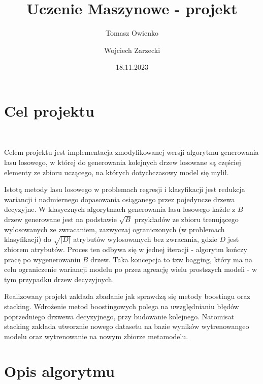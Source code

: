 \documentclass[10pt,a4paper]{article}
\title{Uczenie Maszynowe - projekt}
\author{Tomasz Owienko \and Wojciech Zarzecki}
\date{18.11.2023}
\begin{document}
	\maketitle
	
	
	
	\lstset{basicstyle=\small,style=code}


\section{Cel projektu}\

Celem projektu jest implementacja zmodyfikowanej wersji algorytmu generowania lasu losowego, w której do generowania kolejnych drzew losowane są częściej elementy ze zbioru uczącego, na których dotychczasowy model się mylił.


Istotą metody lasu losowego w problemach regresji i klasyfikacji jest redukcja wariancji i nadmiernego dopasowania osiąganego przez pojedyncze drzewa decyzyjne. W klasycznych algorytmach generowania lasu losowego każde z $B$ drzew generowane jest na podstawie $\sqrt{B}$ przykładów ze zbioru trenującego wylosowanych ze zwracaniem, zazwyczaj ograniczonych (w problemach klasyfikacji) do $\sqrt{|D|}$ atrybutów wylosowanych bez zwracania, gdzie $D$ jest zbiorem atrybutów. Proces ten odbywa się w jednej iteracji - algorytm kończy pracę po wygenerowaniu $B$ drzew. Taka koncepcja to tzw bagging, który ma na celu ograniczenie wariancji modelu po przez agreację wielu prostszych modeli - w tym przypadku drzew decyzyjnych.

Realizowany projekt zakłada zbadanie jak sprawdzą się metody boostingu oraz stacking. Wdrożenie metod boostingowych polega na uwzględnianiu błędów poprzedniego drzwewa decyzyjnego, przy budowanie kolejnego. Natomisat stacking zakłada utworznie nowego datasetu na bazie wyników wytrenowangeo modelu oraz wytrenowanie na nowym zbiorze metamodelu.

\section{Opis algorytmu}
\end{document}
